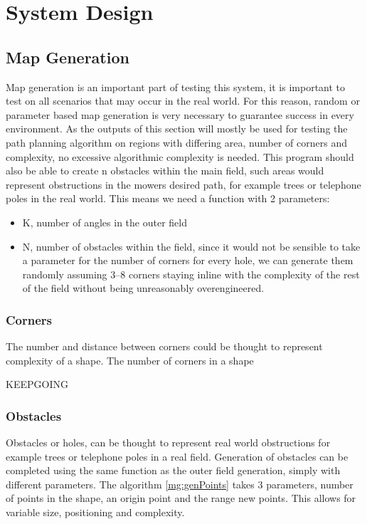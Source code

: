 \documentclass[final]{cmpreport_02}
\begin{document}
\section{System Design}

\subsection{Map Generation}
Map generation is an important part of testing this system, it is important to test on all scenarios that may occur in the real world.
For this reason, random or parameter based map generation is very necessary to guarantee success in every environment.
As the outputs of this section will mostly be used for testing the path planning algorithm on regions with differing area, number of corners and complexity, no excessive algorithmic complexity is needed.
This program should also be able to create n obstacles within the main field, such areas would represent obstructions in the mowers desired path, for example trees or telephone poles in the real world.
This means we need a function with 2 parameters:

\begin{itemize}
	\item K, number of angles in the outer field
	\item N, number of obstacles within the field, since it would not be sensible to take a parameter for the number of corners for every hole, we can generate them randomly assuming 3–8 corners staying inline with the complexity of the rest of the field without being unreasonably overengineered.
\end{itemize}


\subsubsection{Corners}
The number and distance between corners could be thought to represent complexity of a shape.
The number of corners in a shape

KEEPGOING

\subsubsection{Obstacles}
Obstacles or holes, can be thought to represent real world obstructions for example trees or telephone poles in a real field.
Generation of obstacles can be completed using the same function as the outer field generation, simply with different parameters.
The algorithm \ref{mg:genPoints} takes 3 parameters, number of points in the shape, an origin point and the range new points.
This allows for variable size, positioning and complexity.
\end{document}
